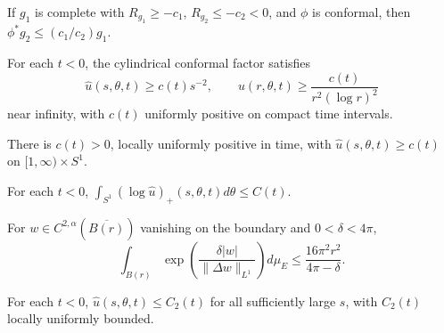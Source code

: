 \begin{lemma}
\label{lem:chow-iv-schwarz-pick}
If \(g_1\) is complete with \(R_{g_1}\ge-c_1\), \(R_{g_2}\le-c_2<0\), and
\(\phi\) is conformal, then \(\phi^*g_2\le(c_1/c_2)g_1\).
\end{lemma}

\begin{lemma}
\label{lem:chow-iv-hyperbolic-cusp-barrier}
For each \(t<0\), the cylindrical conformal factor satisfies
\[
 \widehat u(s,\theta,t)\ge c(t)s^{-2},\qquad
 u(r,\theta,t)\ge\frac{c(t)}{r^2(\log r)^2}
\]
near infinity, with \(c(t)\) uniformly positive on compact time intervals.
\end{lemma}

\begin{lemma}
\label{lem:chow-iv-conformal-factor-lower}
There is \(c(t)>0\), locally uniformly positive in time, with
\(\widehat u(s,\theta,t)\ge c(t)\) on \([1,\infty)\times S^1\).
\end{lemma}

\begin{lemma}
\label{lem:chow-iv-conformal-factor-averages}
For each \(t<0\), \(\int_{S^1}(\log\widehat u)_+(s,\theta,t)d\theta\le C(t)\).
\end{lemma}

\begin{lemma}
\label{lem:chow-iv-brezis-merle}
For \(w\in C^{2,\alpha}(\overline{B(r)})\) vanishing on the boundary and
\(0<\delta<4\pi\),
\[
\int_{B(r)}\exp\!\left(\frac{\delta|w|}{\|\Delta w\|_{L^1}}\right)d\mu_E
\le\frac{16\pi^2r^2}{4\pi-\delta}.
\]
\end{lemma}

\begin{lemma}
\label{lem:chow-iv-conformal-factor-upper}
For each \(t<0\), \(\widehat u(s,\theta,t)\le C_2(t)\) for all sufficiently
large \(s\), with \(C_2(t)\) locally uniformly bounded.
\end{lemma}

